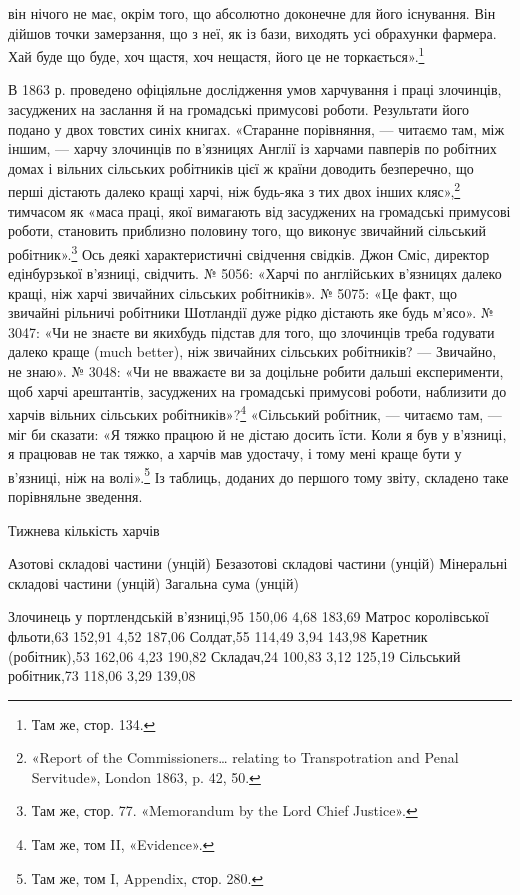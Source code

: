 \parcont{}  %
він нічого не має, окрім того, що абсолютно доконечне для його
існування. Він дійшов точки замерзання, що з неї, як із бази,
виходять усі обрахунки фармера. Хай буде що буде, хоч щастя,
хоч нещастя, його це не торкається».\footnote{
Там же, стор. 134.
}

В 1863 р. проведено офіціяльне дослідження умов харчування
і праці злочинців, засуджених на заслання й на громадські примусові
роботи. Результати його подано у двох товстих синіх
книгах. «Старанне порівняння, — читаємо там, між іншим, —
харчу злочинців по в’язницях Англії із харчами павперів по
робітних домах і вільних сільських робітників цієї ж країни
доводить безперечно, що перші дістають далеко кращі харчі,
ніж будь-яка з тих двох інших кляс»,\footnote{
«Report of the Commissioners\dots{} relating to Transpotration and
Penal Servitude», London 1863, p. 42, 50.
} тимчасом як «маса
праці, якої вимагають від засуджених на громадські примусові
роботи, становить приблизно половину того, що виконує звичайний
сільський робітник».\footnote{
Там же, стор. 77. «Memorandum by the Lord Chief Justice».
} Ось деякі характеристичні свідчення
свідків. Джон Сміс, директор едінбурзької в’язниці, свідчить.
№ 5056: «Харчі по англійських в’язницях далеко кращі, ніж
харчі звичайних сільських робітників». № 5075: «Це факт, що
звичайні рільничі робітники Шотландії дуже рідко дістають яке
будь м’ясо». № 3047: «Чи не знаєте ви якихбудь підстав для
того, що злочинців треба годувати далеко краще (much better),
ніж звичайних сільських робітників? — Звичайно, не знаю».
№ 3048: «Чи не вважаєте ви за доцільне робити дальші експерименти,
щоб харчі арештантів, засуджених на громадські примусові
роботи, наблизити до харчів вільних сільських робітників»?\footnote{
Там же, том II, «Evidence».
} «Сільський робітник, — читаємо там, — міг би сказати:
«Я тяжко працюю й не дістаю досить їсти. Коли я був у
в’язниці, я працював не так тяжко, а харчів мав удостачу, і тому
мені краще бути у в’язниці, ніж на волі».\footnote{
Там же, том I, Appendix, стор. 280.
} Із таблиць, доданих
до першого тому звіту, складено таке порівняльне зведення.

Тижнева кількість харчів

Азотові  складові  частини (унцій)
Безазотові  складові  частини (унцій)
Мінеральні  складові  частини (унцій)
Загальна  сума (унцій)

Злочинець у портлендській
в’язниці,95                150,06
4,68                  183,69
Матрос королівської
фльоти,63                152,91
4,52                   187,06
Солдат,55                114,49
3,94                   143,98
Каретник (робітник),53                162,06                4,23
             190,82
Складач,24                100,83
3,12                   125,19
Сільський робітник,73                 118,06                3,29
              139,08
